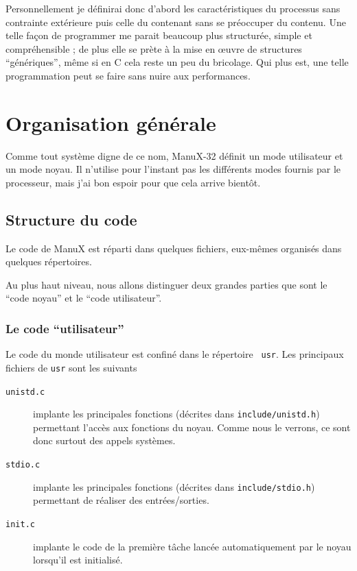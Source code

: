    Personnellement je définirai donc d'abord les caractéristiques du
processus sans contrainte extérieure puis celle du contenant sans se
préoccuper du contenu. Une telle façon de programmer me parait
beaucoup plus structurée, simple et compréhensible ; de plus elle se
prète à la mise en \oe{}uvre de structures ``génériques'', même si en
C cela reste un peu du bricolage. Qui plus est, une telle
programmation peut se faire sans nuire aux performances.

\section{Organisation générale}

   Comme tout système digne de ce nom, ManuX-32 définit un mode
utilisateur et un mode noyau. Il n'utilise pour l'instant pas les
différents modes fournis par le processeur, mais j'ai bon espoir pour
que cela arrive bientôt.

\subsection{Structure du code}

   Le code de ManuX est réparti dans quelques fichiers, eux-mêmes
organisés dans quelques répertoires.

   Au plus haut niveau, nous allons distinguer deux grandes parties
   que sont le ``code noyau'' et le ``code utilisateur''.
   
%
\subsubsection{Le code ``utilisateur''}

   Le code du monde utilisateur est confiné dans le répertoire {\tt
usr}.
  Les principaux fichiers de {\tt usr} sont les suivants

\begin{description}
   \item[{\tt unistd.c}] implante les principales fonctions (décrites
     dans {\tt include/unistd.h}) permettant l'accès aux fonctions du
     noyau. Comme nous le verrons, ce sont donc surtout des appels
     systèmes. 
   \item[{\tt stdio.c}] implante les principales fonctions (décrites
     dans {\tt include/stdio.h}) permettant de réaliser des
     entrées/sorties.
   \item[{\tt init.c}] implante le code de la première tâche lancée
     automatiquement par le noyau lorsqu'il est initialisé.
\end{description}

